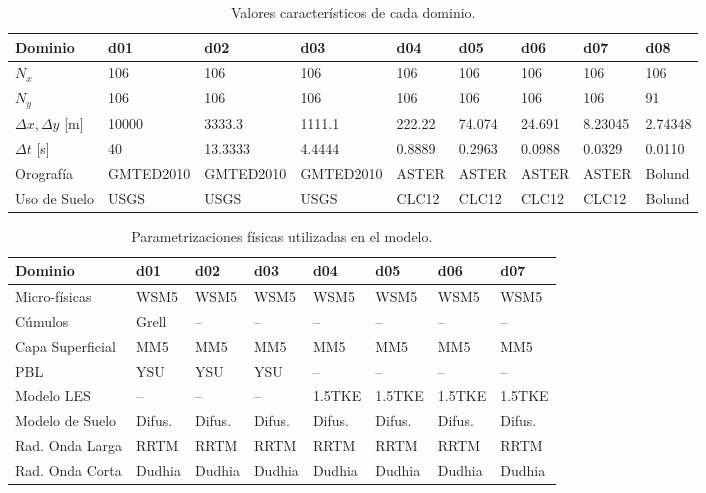 \begin{table}[H]
	\caption{Valores característicos de cada dominio.}\label{tab:c3val_carac}
	\centering\footnotesize
	\begin{tabular}{lllllllll}
		\toprule
		Dominio 				& d01	&	d02	&	d03	&	d04	&	d05	&	d06 &	d07&	d08 \\
		\midrule
		$N_x$		& 106 & 106 & 106 &106&106&106&106&106  \\
		$N_y$	 		& 106 & 106 & 106 &106&106&106&106&91  \\
		$\Delta x,\Delta y$	[m]	 		& 10000 & 3333.3 & 1111.1 &222.22&74.074&24.691&8.23045&2.74348  \\
		$\Delta t$	[s]	 		& 40 & 13.3333 & 4.4444 &0.8889&0.2963&0.0988&0.0329&0.0110  \\
		Orografía		 	& GMTED2010 & GMTED2010 & GMTED2010 &ASTER&ASTER&ASTER&ASTER&Bolund  \\
		Uso de Suelo					& USGS & USGS & USGS &CLC12&CLC12&CLC12&CLC12&Bolund \\
		\bottomrule
	\end{tabular}
\end{table}

\begin{table}[H]
	\caption{Parametrizaciones físicas utilizadas en el modelo.}\label{tab:c3param_fis}
	\centering\footnotesize
	\begin{tabular}{llllllll}
		\toprule
		Dominio 				& d01	&	d02	&	d03	&	d04	&	d05	&	d06 &	d07 \\
		\midrule
		Micro-físicas		 	& WSM5 & WSM5 & WSM5 &WSM5&WSM5&WSM5&WSM5  \\
		Cúmulos			 		& Grell & -- & -- & -- & -- & -- & -- \\ 
		Capa Superficial	 	& MM5 & MM5 & MM5 & MM5 & MM5 & MM5 & MM5 \\
		PBL				 		& YSU & YSU & YSU & -- & -- & -- & -- \\
		Modelo LES				 		& -- & -- & -- & 1.5TKE & 1.5TKE & 1.5TKE & 1.5TKE \\
		Modelo de Suelo 		& Difus. & Difus. & Difus. & Difus. & Difus. & Difus. & Difus. \\
		Rad. Onda Larga	& RRTM &RRTM&RRTM&RRTM&RRTM&RRTM&RRTM \\
		Rad. Onda Corta	& Dudhia &Dudhia&Dudhia&Dudhia&Dudhia&Dudhia&Dudhia \\
		\bottomrule
	\end{tabular}
\end{table}


